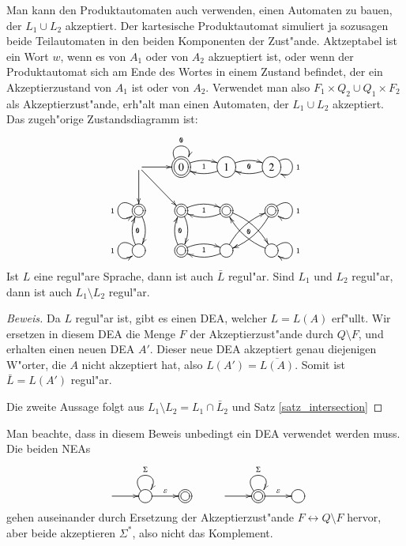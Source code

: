 Man kann den Produktautomaten auch
verwenden, einen Automaten zu bauen, der $L_1\cup L_2$
akzeptiert. Der kartesische Produktautomat simuliert ja sozusagen
beide Teilautomaten in den beiden Komponenten der Zust"ande. 
Aktzeptabel ist ein Wort $w$, wenn es von $A_1$
oder von $A_2$ akzueptiert ist, oder wenn der Produktautomat
sich am Ende des Wortes in einem Zustand befindet, der ein
Akzeptierzustand von $A_1$ ist oder von $A_2$. Verwendet
man also $F_1\times Q_2\cup Q_1\times F_2$ als Akzeptierzust"ande,
erh"alt man einen Automaten, der $L_1\cup L_2$ akzeptiert.
Das zugeh"orige Zustandsdiagramm ist:
\[
\entrymodifiers={++[o][F]}
\xymatrix{
*+\txt{} \ar[r] \ar[d] \ar[dr]
	&*++[o][F=]{0} \ar@/^/[r]_{\tt 1} \ar@(ul,ur)^{\tt 0}
		&{1} \ar@/^/[l] \ar@/^/[r]_{\tt 0}
			&{2}\ar@(ur,dr)^{\tt 1} \ar@/^/[l]
\\
*++[o][F=]{} \ar@/^/[d] \ar@(ul,dl)_{\tt 1}
	&*++[o][F=]{} \ar@/^/[d]{\tt 0} \ar@/^/[r]_{\tt 1}
		&*++[o][F=]{} \ar@/^/[l] \ar@/^/[dr]_{\tt 0}
			&*++[o][F=]{}\ar@(ur,dr)^{\tt 1} \ar@/^/[dl]
\\
{} \ar@/^/[u]_{\tt 0} \ar@(ul,dl)_{\tt 1}
	&*++[o][F=]{} \ar@/^/[u]_{\tt 0} \ar@/^/[r]_{\tt 1}
		&{} \ar@/^/[l] \ar@/^/[ur]
			&{}\ar@(ur,dr)^{\tt 1} \ar@/^/[ul]
}
\]

\begin{satz}
\label{satz_regcomplement}
Ist $L$ eine regul"are Sprache, dann ist auch $\bar L$ regul"ar.
Sind $L_1$ und $L_2$ regul"ar, dann ist auch $L_1\setminus L_2$
regul"ar.
\end{satz}

\begin{proof}[Beweis]
Da $L$ regul"ar ist, gibt es einen DEA, welcher $L=L(A)$ erf"ullt.
Wir ersetzen in diesem DEA die Menge $F$ der Akzeptierzust"ande
durch $Q\setminus F$, und erhalten einen neuen DEA $A'$. Dieser
neue DEA akzeptiert genau diejenigen W"orter, die $A$ nicht
akzeptiert hat, also $L(A')=\overline{L(A)}$. Somit ist $\bar L=L(A')$
regul"ar.

Die zweite Aussage folgt aus $L_1\setminus L_2=L_1\cap\bar L_2$ und
Satz \ref{satz_intersection}
\end{proof}
Man beachte, dass in diesem Beweis unbedingt ein DEA verwendet werden
muss. Die beiden NEAs
\[
\entrymodifiers={++[o][F]}
\xymatrix{
*+\txt{}\ar[r]
	&{}\ar@(ul,ur)^{\Sigma} \ar[r]^{\varepsilon}
		&*++[o][F=]{}
&
*+\txt{}\ar[r]
	&*++[o][F=]{}\ar@(ul,ur)^{\Sigma} \ar[r]^{\varepsilon}
		&{}
}
\]
gehen auseinander durch Ersetzung der Akzeptierzust"ande
$F\leftrightarrow Q\setminus F$ hervor, aber beide akzeptieren
$\Sigma^*$, also nicht das Komplement.

